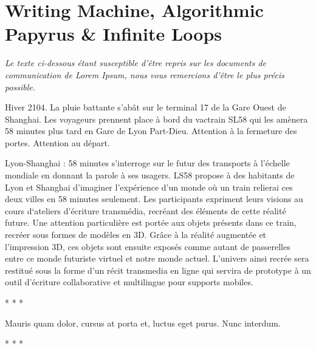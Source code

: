\section{Writing Machine, Algorithmic Papyrus \& Infinite Loops}

{\centering
\textit{Le texte ci-dessous \'etant susceptible
d{\textquoteright}\^etre repris sur les documents de communication de
Lorem Ipsum, nous vous remercions d{\textquoteright}\^etre le plus
pr\'ecis possible.}
\par}

Hiver 2104. La pluie battante s{\textquoteright}ab\^at sur le terminal
17 de la Gare Ouest de Shanghai. Les\newline
voyageurs prennent place \`a bord du vactrain SL58 qui les am\`enera 58
minutes plus tard en\newline
Gare de Lyon Part-Dieu. Attention \`a la fermeture des portes. Attention
au d\'epart.

Lyon-Shanghai : 58 minutes s{\textquoteright}interroge sur le futur des
transports \`a l{\textquoteright}\'echelle mondiale en donnant la
parole \`a ses usagers. LS58 propose \`a des habitants de Lyon et
Shanghai\newline
d{\textquoteright}imaginer l{\textquoteright}exp\'erience
d{\textquoteright}un monde o\`u un train relierai ces deux villes en 58
minutes seulement.\newline
Les participants expriment leurs visions au cours
d{\textquoteleft}ateliers d{\textquoteright}\'ecriture transm\'edia,
recr\'eant des \'el\'ements de cette r\'ealit\'e future. Une attention
particuli\`ere est port\'ee aux objets pr\'esents\newline
dans ce train, recr\'eer sous formes de mod\`eles en 3D. Gr\^ace \`a la
r\'ealit\'e augment\'ee et l{\textquoteright}impression 3D, ces objets
sont ensuite expos\'es comme autant de passerelles entre ce monde
futuriste virtuel et notre monde actuel. L{\textquoteright}univers
ainsi recr\'ee sera restitu\'e sous la forme d{\textquoteright}un
r\'ecit transmedia en ligne qui servira de prototype \`a un outil
d{\textquoteright}\'ecriture collaborative et multilingue pour supports
mobiles.

{\centering
* * *
\par}

{\centering
Mauris quam dolor, cursus at porta et, luctus eget purus. Nunc interdum.
\par}

{\centering
* * *
\par}

